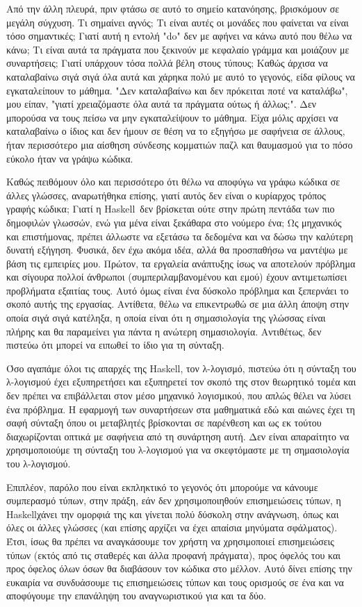 \documentclass[diploma]{softlab-thesis}
\def\H{Haskell}
\begin{document}
Από την άλλη πλευρά, πριν φτάσω σε αυτό το σημείο κατανόησης,
βρισκόμουν σε μεγάλη σύγχυση. Τι σημαίνει αγνός;
Τι είναι αυτές οι μονάδες που φαίνεται να είναι τόσο σημαντικές;
Γιατί αυτή η εντολή "do" δεν με αφήνει να κάνω αυτό που θέλω να κάνω;
Τι είναι αυτά τα πράγματα που ξεκινούν με κεφαλαίο γράμμα και μοιάζουν με
συναρτήσεις; Γιατί υπάρχουν τόσα πολλά βέλη στους τύπους;
Καθώς άρχισα να καταλαβαίνω σιγά σιγά όλα αυτά και χάρηκα πολύ
με αυτό το γεγονός, είδα φίλους να εγκαταλείπουν το μάθημα.
"Δεν καταλαβαίνω και δεν πρόκειται ποτέ να καταλάβω", μου είπαν,
"γιατί χρειαζόμαστε όλα αυτά τα πράγματα ούτως ή άλλως;".
Δεν μπορούσα να τους πείσω να μην εγκαταλείψουν το μάθημα.
Είχα μόλις αρχίσει να καταλαβαίνω ο ίδιος και δεν ήμουν σε θέση να
το εξηγήσω με σαφήνεια σε άλλους,
ήταν περισσότερο μια αίσθηση σύνδεσης κομματιών παζλ και θαυμασμού
για το πόσο εύκολο ήταν να γράψω κώδικα.

Καθώς πειθόμουν όλο και περισσότερο ότι θέλω να αποφύγω να γράφω
κώδικα σε άλλες γλώσσες, αναρωτήθηκα επίσης, γιατί αυτός δεν είναι
ο κυρίαρχος τρόπος γραφής κώδικα; Γιατί η \H\ δεν βρίσκεται ούτε
στην πρώτη πεντάδα των πιο δημοφιλών γλωσσών, ενώ για μένα είναι
ξεκάθαρα στο νούμερο ένα;  Ως μηχανικός και επιστήμονας, πρέπει
άλλωστε να εξετάσω τα δεδομένα και να δώσω την καλύτερη δυνατή εξήγηση.
Φυσικά, δεν έχω ακόμα ιδέα, αλλά θα προσπαθήσω να μαντέψω με
βάση τις εμπειρίες μου. Πρώτον, τα εργαλεία ανάπτυξης ίσως να
αποτελούν πρόβλημα και σίγουρα πολλοί άνθρωποι (συμπεριλαμβανομένου
και εμού) έχουν αντιμετωπίσει προβλήματα εξαιτίας τους.
Αυτό όμως είναι ένα δύσκολο πρόβλημα και ξεπερνάει το σκοπό αυτής
της εργασίας. Αντίθετα, θέλω να επικεντρωθώ σε μια άλλη
άποψη στην οποία σιγά σιγά κατέληξα, η οποία είναι ότι η σημασιολογία της
γλώσσας είναι πλήρης και θα παραμείνει για πάντα η ανώτερη σημασιολογία.
Αντιθέτως, δεν πιστεύω ότι μπορεί να ειπωθεί το ίδιο για τη σύνταξη.

Όσο αγαπάμε όλοι τις απαρχές της \H, τον λ-λογισμό, πιστεύω ότι η
σύνταξη του λ-λογισμού έχει εξυπηρετήσει και εξυπηρετεί τον σκοπό της
στον θεωρητικό τομέα και δεν πρέπει να επιβάλλεται στον μέσο μηχανικό
λογισμικού, που απλώς θέλει να λύσει ένα πρόβλημα.
Η εφαρμογή των συναρτήσεων στα μαθηματικά εδώ και
αιώνες έχει τη σαφή σύνταξη όπου οι μεταβλητές βρίσκονται σε παρένθεση
και ως εκ τούτου διαχωρίζονται οπτικά με σαφήνεια από τη συνάρτηση αυτή.
Δεν είναι απαραίτητο να χρησιμοποιούμε τη σύνταξη του λ-λογισμού για
να σκεφτόμαστε με τη σημασιολογία του λ-λογισμού.

Επιπλέον, παρόλο που είναι εκπληκτικό το γεγονός ότι μπορούμε να
κάνουμε συμπερασμό τύπων, στην πράξη, εάν δεν χρησιμοποιηθούν
επισημειώσεις τύπων, η \H χάνει την ομορφιά της και γίνεται πολύ
δύσκολη στην ανάγνωση,
όπως και όλες οι άλλες γλώσσες (και επίσης αρχίζει να έχει απαίσια
μηνύματα σφάλματος).  Έτσι, ίσως θα πρέπει να αναγκάσουμε τον χρήστη να
χρησιμοποιεί επισημειώσεις τύπων (εκτός από τις σταθερές και άλλα προφανή
πράγματα), προς όφελός του και προς όφελος όλων όσων θα διαβάσουν τον
κώδικα στο μέλλον.  Αυτό δίνει επίσης την ευκαιρία να
συνδυάσουμε τις επισημειώσεις τύπων και τους ορισμούς σε ένα και να
αποφύγουμε την επανάληψη του αναγνωριστικού για και τα δύο.
\end{document}
